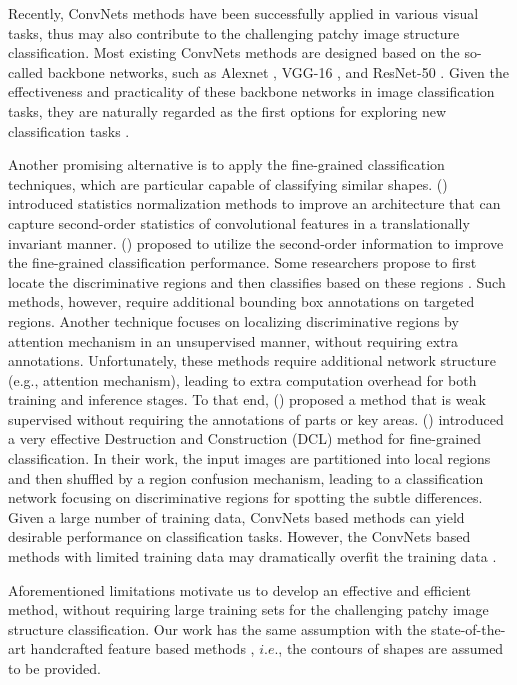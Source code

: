 \documentclass[letterpaper]{article} %
\begin{document}
Recently, ConvNets methods have been successfully applied in various visual tasks, thus may also contribute to the challenging patchy image structure classification. Most existing ConvNets methods are designed based on the so-called backbone networks, such as Alexnet \cite{52}, VGG-16 \cite{21}, and ResNet-50 \cite{34}. Given the effectiveness and practicality of these backbone networks in image classification tasks, they are naturally regarded as the first options for exploring new classification tasks \cite{wu2019ip102}. 

Another promising alternative is to apply the fine-grained classification techniques, which are particular capable of classifying similar shapes. \citeauthor{lin2017improved} (\citeyear{lin2017improved}) introduced statistics normalization methods to improve an architecture that can capture second-order statistics of convolutional features in a translationally invariant manner. \citeauthor{li2018towards} (\citeyear{li2018towards}) proposed to utilize the second-order information to improve the fine-grained classification performance. 
Some researchers propose to first locate the discriminative regions and then classifies based on these regions \cite{huang2016part}. Such methods, however, require additional bounding box annotations on targeted regions. Another technique focuses on localizing discriminative regions by attention mechanism in an unsupervised manner, without requiring extra annotations. Unfortunately, these methods \cite{zheng2017learning,fu2017look,Zheng_2019_CVPR} require additional network structure (e.g., attention mechanism), leading to extra computation overhead for both training and inference stages. To that end, \citeauthor{Yang2018Learning} (\citeyear{Yang2018Learning}) proposed a method that is weak supervised without requiring the annotations of parts or key areas. \citeauthor{chen2019destruction} (\citeyear{chen2019destruction}) introduced a very effective Destruction and Construction (DCL) method for fine-grained classification. In their work, the input images are partitioned into local regions and then shuffled by a region confusion mechanism, leading to a classification network focusing on discriminative regions for spotting the subtle differences. Given a large number of training data, ConvNets based methods can yield desirable performance on classification tasks. However, the ConvNets based methods with limited training data may dramatically overfit the training data \cite{37}. 


Aforementioned limitations motivate us to develop an effective and efficient method, without requiring large training sets for the challenging patchy image structure classification. Our work has the same assumption with the state-of-the-art handcrafted feature based methods \cite{3,11,7,28,25,20,4}, $i.e.$, the contours of shapes are assumed to be provided.  
\end{document}
